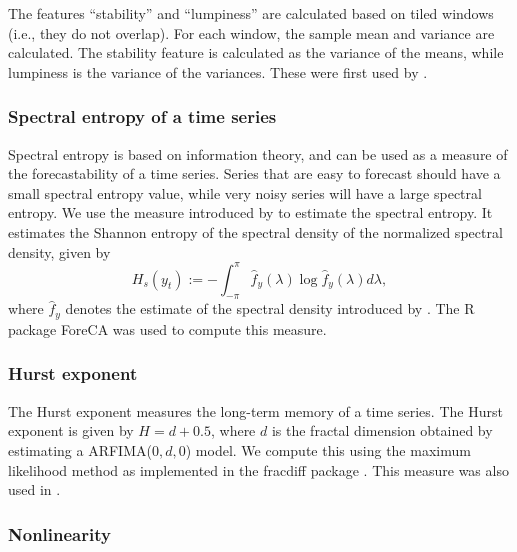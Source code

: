 \documentclass[11pt,a4paper,]{article}
\begin{document}
The features ``stability'' and ``lumpiness'' are calculated based on tiled windows (i.e., they do not overlap). For each window, the sample mean and variance are calculated. The stability feature is calculated as the variance of the means, while lumpiness is the variance of the variances. These were first used by \textcite{hyndman2015large}.

\hypertarget{spectral-entropy-of-a-time-series}{%
\subsubsection*{Spectral entropy of a time series}\label{spectral-entropy-of-a-time-series}}

Spectral entropy is based on information theory, and can be used as a measure of the forecastability of a time series. Series that are easy to forecast should have a small spectral entropy value, while very noisy series will have a large spectral entropy. We use the measure introduced by \textcite{goerg2013forecastable} to estimate the spectral entropy. It estimates the Shannon entropy of the spectral density of the normalized spectral density, given by
\[
  H_{s}(y_t):=-\int_{-\pi}^{\pi}\hat f_y(\lambda)\log \hat f_y({\lambda})d\lambda,
\]
where \(\hat{f}_y\) denotes the estimate of the spectral density introduced by \textcite{nuttall1982spectral}. The R package ForeCA \autocite{Foreca} was used to compute this measure.

\hypertarget{hurst-exponent}{%
\subsubsection*{Hurst exponent}\label{hurst-exponent}}

The Hurst exponent measures the long-term memory of a time series. The Hurst exponent is given by \(H=d+0.5\), where \(d\) is the fractal dimension obtained by estimating a ARFIMA(\(0, d, 0\)) model. We compute this using the maximum likelihood method \autocite{haslett1989space} as implemented in the fracdiff package \autocite{fracdiff}. This measure was also used in \textcite{wang2009rule}.

\hypertarget{nonlinearity}{%
\subsubsection*{Nonlinearity}\label{nonlinearity}}
\end{document}
